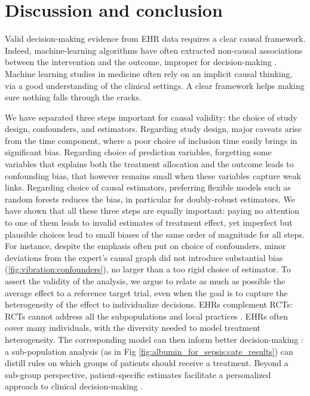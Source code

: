 \documentclass[10pt,letterpaper]{article}
\begin{document}
\section*{Discussion and conclusion}\label{sec:discussion}


Valid decision-making evidence from EHR data requires a clear causal framework.
Indeed, machine-learning algorithms have often extracted non-causal associations
between the intervention and the outcome, improper for decision-making
\cite{winkler2019association,badgeley2019deep,obermeyer2019dissecting}.
Machine learning studies in medicine often rely on an implicit causal
thinking, via a good understanding of the clinical settings.
A clear framework helps making
sure nothing falls through the cracks.

We have separated three steps important for causal validity: the choice
of study design, confounders, and estimators.
%
Regarding study design, major caveats arise from the time component,
where a poor choice of inclusion time easily brings in significant bias. Regarding choice of prediction
variables, forgetting some variables that explains both the treatment
allocation and the outcome leads to confounding bias, that however
remains small when these
variables capture weak links. Regarding choice of causal estimators,
preferring flexible models such as random forests reduces the bias, in
particular for doubly-robust estimators.
%
We have shown that all these three steps are equally important: paying no
attention to one of them leads to invalid estimates of treatment effect,
yet imperfect but plausible choices lead to small biases of the same
order of magnitude for all steps.
%
For instance, despite the emphasis often put on choice of confounders,
minor deviations from the expert's causal graph did not introduce
substantial bias (\ref{fig:vibration:confounders}), no larger than a too
rigid choice of estimator.
To assert the validity of the analysis, we argue to relate as much as
possible the average effect to a reference target trial, even when the
goal is to capture the heterogeneity of the effect to individualize
decisions.
EHRs complement RCTs: RCTs cannot address all the
subpopulations and local practices
\cite{travers2007external,kennedy2015literature}. EHRs often cover many
individuals, with the diversity needed to model treatment
heterogeneity. The corresponding model can then inform better
decision-making \cite{prosperi2020causal}: a sub-population analysis  (as in Fig
\ref{fig:albumin_for_sepsis:cate_results}) can distill rules on which groups
of patients should receive a treatment. Beyond a sub-group perspective,
patient-specific estimates facilitate a personalized approach
to clinical decision-making \cite{kent2018personalized}.
\end{document}
